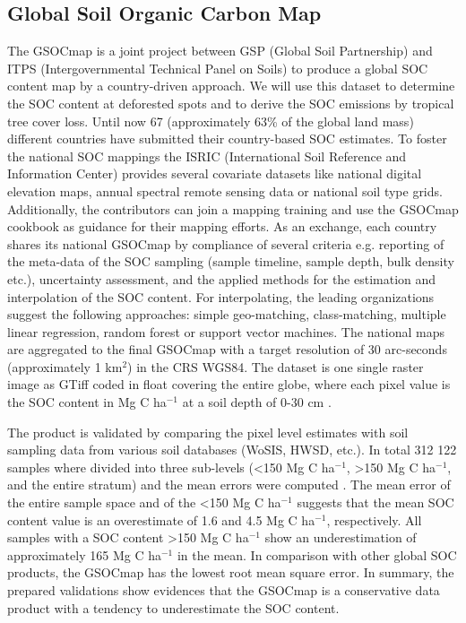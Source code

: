 	\subsection{Global Soil Organic Carbon Map}
		The \ac{GSOCmap} is a joint project between GSP (Global Soil Partnership) and ITPS (Intergovernmental Technical Panel on Soils) to produce a global \ac{SOC} content map by a country-driven approach. We will use this dataset to determine the \ac{SOC} content at deforested spots and to derive the \ac{SOC} emissions by tropical tree cover loss. Until now 67 (approximately 63\% of the global land mass) different countries have submitted their country-based \ac{SOC} estimates. To foster the national \ac{SOC} mappings the ISRIC (International Soil Reference and Information Center) provides several covariate datasets like national digital elevation maps, annual spectral remote sensing data or national soil type grids. Additionally, the contributors can join a mapping training and use the \ac{GSOCmap} cookbook as guidance for their mapping efforts. As an exchange, each country shares its national \ac{GSOCmap} by compliance of several criteria e.g. reporting of the meta-data of the \ac{SOC} sampling (sample timeline, sample depth, bulk density etc.), uncertainty assessment, and the applied methods for the estimation and interpolation of the \ac{SOC} content. For interpolating, the leading organizations suggest the following approaches: simple geo-matching, class-matching, multiple linear regression, random forest or support vector machines. The national maps are aggregated to the final \ac{GSOCmap} with a target resolution of 30 arc-seconds (approximately 1 km$^2$) in the \ac{CRS} \ac{WGS84}. The dataset is one single raster image as \ac{GTiff} coded in float covering the entire globe, where each pixel value is the \ac{SOC} content in Mg C ha$^{-1}$ at a soil depth of 0-30 cm \citep{FAO2018}.

		The product is validated by comparing the pixel level estimates with soil sampling data from various soil databases (WoSIS, HWSD, etc.). In total 312 122 samples where divided into three sub-levels (<150 Mg C ha$^{-1}$, >150 Mg C ha$^{-1}$, and the entire stratum) and the mean errors were computed . The mean error of the entire sample space and of the <150 Mg C ha$^{-1}$ suggests that the mean \ac{SOC} content value is an overestimate of 1.6 and 4.5 Mg C ha$^{-1}$, respectively. All samples with a \ac{SOC} content >150 Mg C ha$^{-1}$ show an underestimation of approximately 165 Mg C ha$^{-1}$ in the mean. In comparison with other global \ac{SOC} products, the \ac{GSOCmap} has the lowest root mean square error. In summary, the prepared validations show evidences that the \ac{GSOCmap} is a conservative data product with a tendency to underestimate the \ac{SOC} content.

